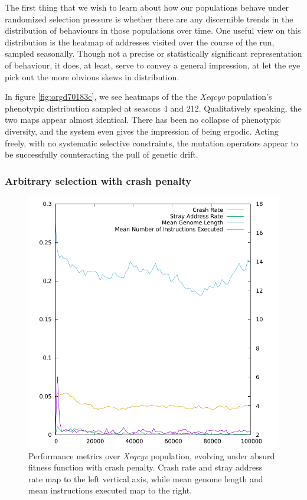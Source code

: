 \documentclass[12pt,glossary]{dalthesis}
\begin{document}
The first thing that we wish to learn about how our populations behave under
randomized selection pressure is whether there are any discernible 
trends in the distribution of behaviours in those populations over time. 
One useful view on this distribution is the heatmap of addresses visited over the
course of the run, sampled seasonally. Though not a precise or statistically
significant representation of behaviour, it does, at least, serve to convey a
general impression, at let the eye pick out the more obvious skews in distribution. 

In figure \ref{fig:orgd70183c}, we see heatmaps of the the \emph{Xeqcyv} population's
phenotypic distribution sampled at seasons 4 and 212. Qualitatively speaking, the
two maps appear almost identical. There has been no collapse of phenotypic diversity,
and the system even gives the impression of being ergodic. Acting freely, with
no systematic selective constraints, the mutation operators appear to be successfully
counteracting the pull of genetic drift. 


\subsubsection{Arbitrary selection with crash penalty}
\label{sec:orgffcfedf}
\label{orgb871cac}

\begin{figure}[htbp]
\centering
\includegraphics[width=.9\linewidth]{../images/plots/xeqcyv_kafka_performance.pdf}
\caption{\label{fig:org5306d1b}
Performance metrics over \emph{Xeqcyv} population, evolving under absurd fitness function with crash penalty. Crash rate and stray address rate map to the left vertical axis, while mean genome length and mean instructions executed map to the right.}
\end{figure}
\end{document}
